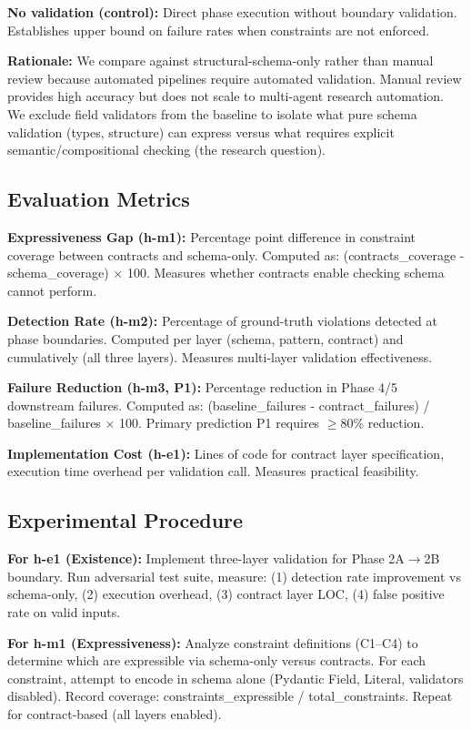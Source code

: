 \textbf{No validation (control):} Direct phase execution without boundary validation. Establishes upper bound on failure rates when constraints are not enforced.

\textbf{Rationale:} We compare against structural-schema-only rather than manual review because automated pipelines require automated validation. Manual review provides high accuracy but does not scale to multi-agent research automation. We exclude field validators from the baseline to isolate what pure schema validation (types, structure) can express versus what requires explicit semantic/compositional checking (the research question).

\subsection{Evaluation Metrics}

\textbf{Expressiveness Gap (h-m1):} Percentage point difference in constraint coverage between contracts and schema-only. Computed as: (contracts\_coverage - schema\_coverage) $\times$ 100. Measures whether contracts enable checking schema cannot perform.

\textbf{Detection Rate (h-m2):} Percentage of ground-truth violations detected at phase boundaries. Computed per layer (schema, pattern, contract) and cumulatively (all three layers). Measures multi-layer validation effectiveness.

\textbf{Failure Reduction (h-m3, P1):} Percentage reduction in Phase 4/5 downstream failures. Computed as: (baseline\_failures - contract\_failures) / baseline\_failures $\times$ 100. Primary prediction P1 requires $\geq$80\% reduction.

\textbf{Implementation Cost (h-e1):} Lines of code for contract layer specification, execution time overhead per validation call. Measures practical feasibility.

\subsection{Experimental Procedure}

\textbf{For h-e1 (Existence):} Implement three-layer validation for Phase 2A$\rightarrow$2B boundary. Run adversarial test suite, measure: (1) detection rate improvement vs schema-only, (2) execution overhead, (3) contract layer LOC, (4) false positive rate on valid inputs.

\textbf{For h-m1 (Expressiveness):} Analyze constraint definitions (C1--C4) to determine which are expressible via schema-only versus contracts. For each constraint, attempt to encode in schema alone (Pydantic Field, Literal, validators disabled). Record coverage: constraints\_expressible / total\_constraints. Repeat for contract-based (all layers enabled).


